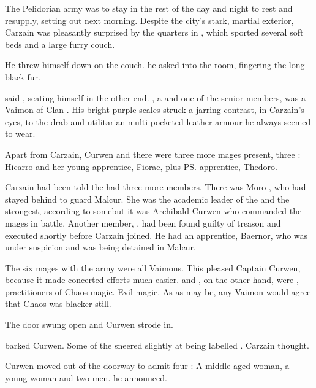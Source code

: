 \new
{}

The Pelidorian army was to stay in \Forklin{} the rest of the day and night to rest and resupply, setting out next morning. 
Despite the city's stark, martial exterior, Carzain was pleasantly surprised by the \ishrah{} quarters in \Forklin, which sported several soft beds and a large furry couch. 

 He threw himself down on the couch. 
 he asked into the room, fingering the long black fur. 

 said \Sanyor, seating himself in the other end. 
\Sanyor, a \dax{} and one of the senior \ishrah{} members, was a Vaimon of Clan \Telcra. 
His bright purple scales struck a jarring contrast, in Carzain's eyes, to the drab and utilitarian multi-pocketed leather armour he always seemed to wear. 

Apart from Carzain, Curwen and \Sanyor{} there were three more \ishrah{} mages present, three \sphyles: 
Hicarro and her young apprentice, Fiorae, plus \ps{\Sanyor} apprentice, Thedoro. 

Carzain had been told the \ishrah{} had three more members. 
There was Moro \Cornel, who had stayed behind to guard Malcur. 
She was the academic leader of the \ishrah\dash and the strongest, according to some\dash but it was Archibald Curwen who commanded the mages in battle. 
Another member, \Ambrose{} \Onatol{}, had been found guilty of treason and executed shortly before Carzain joined. 
He had an apprentice, Baernor, who was under suspicion and was being detained in Malcur. 

The six mages with the army were all Vaimons. 
This pleased Captain Curwen, because it made concerted efforts much easier. 
\Cornel{} and \Onatol{}, on the other hand, were \Rethyax{}, practitioners of Chaos magic. 
Evil magic. 
As  as \Itzach{} may be, any Vaimon would agree that Chaos was blacker still. 

The door swung open and Curwen strode in. 

 barked Curwen. 
Some of the \sphyles{} sneered slightly at being labelled . 
 Carzain thought. 

Curwen moved out of the doorway to admit four \humans: 
A middle-aged woman, a young woman and two men. 
 he announced. 

